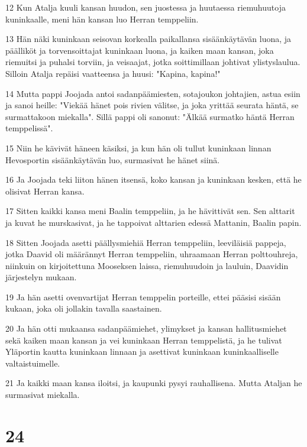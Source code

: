 \par 12 Kun Atalja kuuli kansan huudon, sen juostessa ja huutaessa riemuhuutoja kuninkaalle, meni hän kansan luo Herran temppeliin.
\par 13 Hän näki kuninkaan seisovan korkealla paikallansa sisäänkäytävän luona, ja päälliköt ja torvensoittajat kuninkaan luona, ja kaiken maan kansan, joka riemuitsi ja puhalsi torviin, ja veisaajat, jotka soittimillaan johtivat ylistyslaulua. Silloin Atalja repäisi vaatteensa ja huusi: "Kapina, kapina!"
\par 14 Mutta pappi Joojada antoi sadanpäämiesten, sotajoukon johtajien, astua esiin ja sanoi heille: "Viekää hänet pois rivien välitse, ja joka yrittää seurata häntä, se surmattakoon miekalla". Sillä pappi oli sanonut: "Älkää surmatko häntä Herran temppelissä".
\par 15 Niin he kävivät häneen käsiksi, ja kun hän oli tullut kuninkaan linnan Hevosportin sisäänkäytävän luo, surmasivat he hänet siinä.
\par 16 Ja Joojada teki liiton hänen itsensä, koko kansan ja kuninkaan kesken, että he olisivat Herran kansa.
\par 17 Sitten kaikki kansa meni Baalin temppeliin, ja he hävittivät sen. Sen alttarit ja kuvat he murskasivat, ja he tappoivat alttarien edessä Mattanin, Baalin papin.
\par 18 Sitten Joojada asetti päällysmiehiä Herran temppeliin, leeviläisiä pappeja, jotka Daavid oli määrännyt Herran temppeliin, uhraamaan Herran polttouhreja, niinkuin on kirjoitettuna Mooseksen laissa, riemuhuudoin ja lauluin, Daavidin järjestelyn mukaan.
\par 19 Ja hän asetti ovenvartijat Herran temppelin porteille, ettei pääsisi sisään kukaan, joka oli jollakin tavalla saastainen.
\par 20 Ja hän otti mukaansa sadanpäämiehet, ylimykset ja kansan hallitusmiehet sekä kaiken maan kansan ja vei kuninkaan Herran temppelistä, ja he tulivat Yläportin kautta kuninkaan linnaan ja asettivat kuninkaan kuninkaalliselle valtaistuimelle.
\par 21 Ja kaikki maan kansa iloitsi, ja kaupunki pysyi rauhallisena. Mutta Ataljan he surmasivat miekalla.

\chapter{24}

